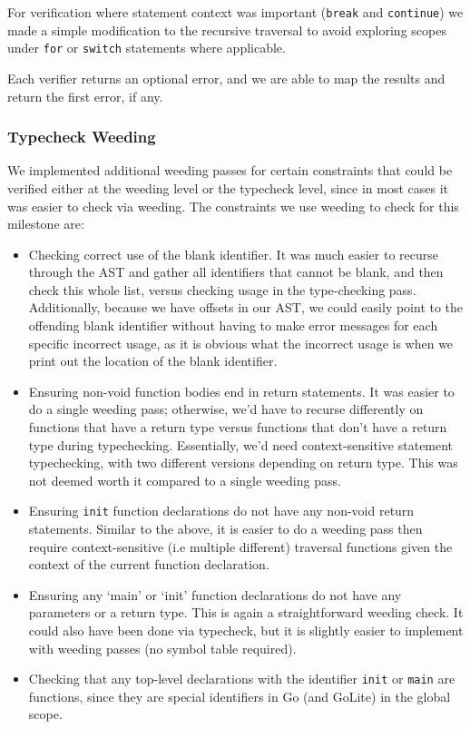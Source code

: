 \documentclass[11pt]{article}
\begin{document}
For verification where statement context was important (\texttt{break}
and \texttt{continue}) we made a simple modification to the recursive
traversal to avoid exploring scopes under \texttt{for} or
\texttt{switch} statements where applicable.

Each verifier returns an optional error, and we are able to map the
results and return the first error, if any.
\subsubsection{Typecheck Weeding}
We implemented additional weeding passes for certain constraints that
could be verified either at the weeding level or the typecheck level,
since in most cases it was easier to check via weeding. The
constraints we use weeding to check for this milestone are:
\begin{itemize}
\item Checking correct use of the blank identifier. It was much easier
  to recurse through the AST and gather all identifiers that cannot be
  blank, and then check this whole list, versus checking usage in the
  type-checking pass. Additionally, because we have offsets in our
  AST, we could easily point to the offending blank identifier without
  having to make error messages for each specific incorrect usage, as
  it is obvious what the incorrect usage is when we print out the
  location of the blank identifier.
\item Ensuring non-void function bodies end in return statements. It
  was easier to do a single weeding pass; otherwise, we'd have to
  recurse differently on functions that have a return type versus
  functions that don't have a return type during
  typechecking. Essentially, we'd need context-sensitive statement
  typechecking, with two different versions depending on return
  type. This was not deemed worth it compared to a single weeding
  pass.
\item Ensuring \texttt{init} function declarations do not have any
  non-void return statements. Similar to the above, it is easier to do
  a weeding pass then require context-sensitive (i.e multiple
  different) traversal functions given the context of the current
  function declaration.
\item Ensuring any `main' or `init' function declarations do not have
  any parameters or a return type. This is again a straightforward
  weeding check.  It could also have been done via typecheck, but it
  is slightly easier to implement with weeding passes (no symbol table
  required).
\item Checking that any top-level declarations with the identifier
  \texttt{init} or \texttt{main} are functions, since they are special
  identifiers in Go (and GoLite) in the global scope.
\end{itemize}
\end{document}
